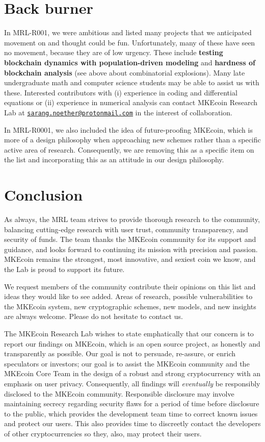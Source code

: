 \documentclass[12pt,english]{mrl}
\theoremstyle{definition}
\numberwithin{equation}{section}
\numberwithin{figure}{section}
\numberwithin{equation}{section}
\numberwithin{equation}{section}
\numberwithin{figure}{section}
\begin{document}
\section{Back burner}

In MRL-R001, we were ambitious and listed many projects that we anticipated movement on and thought could be fun. Unfortunately, many of these have seen no movement, because they are of low urgency. These include \textbf{testing blockchain dynamics with population-driven modeling} and \textbf{hardness of blockchain analysis} (see above about combinatorial explosions). Many late undergraduate math and computer science students may be able to assist us with these. Interested contributors with (i) experience in coding and differential equations or (ii) experience in numerical analysis can contact MKEcoin Research Lab at \href{mailto:sarang.noether@protonmail.com}{\texttt{sarang.noether@protonmail.com}} in the interest of collaboration.

In MRL-R0001, we also included the idea of future-proofing MKEcoin, which is more of a design philosophy when approaching new schemes rather than a specific active area of research. Consequently, we are removing this as a specific item on the list and incorporating this as an attitude in our design philosophy.



\section*{Conclusion}

As always, the MRL team strives to provide thorough research to the community, balancing cutting-edge research with user trust, community transparency, and security of funds. The team thanks the MKEcoin community for its support and guidance, and looks forward to continuing its mission with precision and passion. MKEcoin remains the strongest, most innovative, and sexiest coin we know, and the Lab is proud to support its future.

We request members of the community contribute their opinions on this list and ideas they would like to see added. Areas of research, possible vulnerabilities to the MKEcoin system, new cryptographic schemes, new models, and new insights are always welcome. Please do not hesitate to contact us.  

The MKEcoin Research Lab wishes to state emphatically that our concern is to report our findings on MKEcoin, which is an open source project, as honestly and transparently as possible. Our goal is not to persuade, re-assure, or enrich speculators or investors; our goal is to assist the MKEcoin community and the MKEcoin Core Team in the design of a robust and strong cryptocurrency with an emphasis on user privacy.  Consequently, all findings will \textit{eventually} be responsibly disclosed to the MKEcoin community. Responsible disclosure may involve maintaining secrecy regarding security flaws for a period of time before disclosure to the public, which provides the development team time to correct known issues and protect our users. This also provides time to discreetly contact the developers of other cryptocurrencies so they, also, may protect their users.
\end{document}

